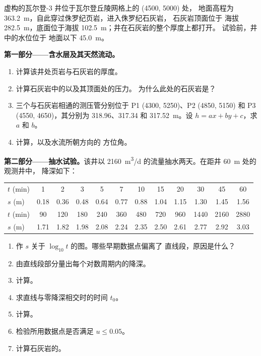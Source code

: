 \begin{problem}
\label{pb:b3:hydrogeology:1}
虚构的瓦尔登-3 井位于瓦尔登丘陵网格上的 (4500, 5000) 处，
地面高程为 \qty{363.2}{m}，自此穿过侏罗纪页岩，进入侏罗纪石灰岩，
石灰岩顶面位于
海拔 \qty{282.5}{m}，底面位于海拔 \qty{102.5}{m}；井在石灰岩的整个厚度上都打开。
试验前，井中的水位位于
地面以下 \qty{45.0}{m}。

\medskip\noindent\textbf{第一部分——含水层及其天然流动。}
\begin{enumerate}
\item 计算该井处页岩与石灰岩的厚度。
\item 计算石灰岩中的以及其顶面处的压力。
  为什么此处的石灰岩是？
\item 三个与石灰岩相通的测压管分别位于 P1 (4300, 5250)、P2
  (4850, 5150) 和 P3 (4550, 4650)，其分别为 318.96、317.34 和
  \qty{317.52}{m}。设 $h = ax + by + c$，求 $a$ 和 $b$。
\item 计算，以及水流所朝方向的
  方位角。
\end{enumerate}

\medskip\noindent\textbf{第二部分——抽水试验。}该井以
\qty{2160}{m^3/d} 的流量抽水两天。在距井 \qty{60}{m} 处的观测井中，
降深如下：
\begin{center}
\begin{tabular}{l*{11}{c}}
\hline
$t$ (\unit{min}) & 1 & 2 & 3 & 5 & 7 & 10 & 15 & 20 & 30 & 45 & 60\\
$s$ (\unit{m}) & 0.18 & 0.36 & 0.48 & 0.64 & 0.77 & 0.88 & 1.04 & 1.15 & 1.30 & 1.45 & 1.56\\
\hline
$t$ (\unit{min}) & 90 & 120 & 180 & 240 & 360 & 480 & 720 & 960 & 1440 & 2160 & 2880\\
$s$ (\unit{m}) & 1.71 & 1.82 & 1.98 & 2.08 & 2.24 & 2.35 & 2.50 & 2.61 & 2.77 & 2.92 & 3.03\\
\hline
\end{tabular}
\end{center}
\begin{enumerate}[resume]
\item 作 $s$ 关于 $\log_{10}t$ 的图。哪些早期数据点偏离了
  直线段，原因是什么？
\item 由直线段部分量出每个对数周期内的降深。
\item 计算。
\item 求直线与零降深相交时的时间 $t_0$。
\item 计算。
\item 检验所用数据点是否满足 $u \le 0.05$。
\item 计算石灰岩的。
\end{enumerate}


\end{problem}
